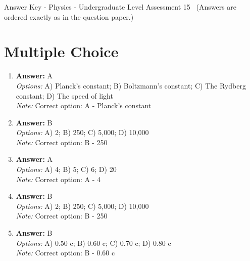 \documentclass[12pt]{article}
\begin{document}
\begin{center}
Answer Key - Physics - Undergraduate Level Assessment 15 \
\small (Answers are ordered exactly as in the question paper.)
\end{center}

\section*{Multiple Choice}
\begin{enumerate}[label=\arabic*.]
\item \textbf{Answer:} A
\\ \textit{Options:} A) Planck's constant; B) Boltzmann's constant; C) The Rydberg constant; D) The speed of light
\\ \textit{Note:} Correct option: A - Planck's constant
\item \textbf{Answer:} B
\\ \textit{Options:} A) 2; B) 250; C) 5,000; D) 10,000
\\ \textit{Note:} Correct option: B - 250
\item \textbf{Answer:} A
\\ \textit{Options:} A) 4; B) 5; C) 6; D) 20
\\ \textit{Note:} Correct option: A - 4
\item \textbf{Answer:} B
\\ \textit{Options:} A) 2; B) 250; C) 5,000; D) 10,000
\\ \textit{Note:} Correct option: B - 250
\item \textbf{Answer:} B
\\ \textit{Options:} A) 0.50 c; B) 0.60 c; C) 0.70 c; D) 0.80 c
\\ \textit{Note:} Correct option: B - 0.60 c
\end{enumerate}
\end{document}
